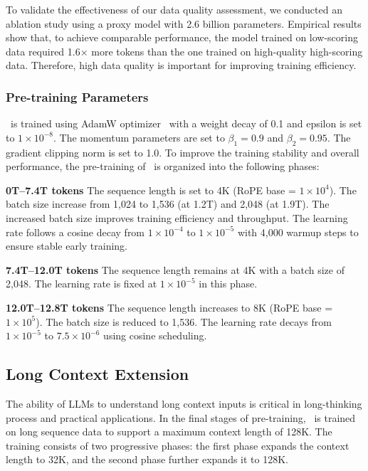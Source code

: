 To validate the effectiveness of our data quality assessment, we conducted an ablation study using a proxy model with 2.6 billion parameters. Empirical results show that, to achieve comparable performance, the model trained on low-scoring data required 1.6× more tokens than the one trained on high-quality high-scoring data. Therefore, high data quality is important for improving training efficiency.



\subsubsection{Pre-training Parameters} \label{sec:hyper_params}
\modelname~is trained using AdamW optimizer~\cite{loshchilov2017decoupled} with a weight decay of 0.1 and epsilon is set to $1 \times 10^{-8}$. 
The momentum parameters are set to $\beta_1 = 0.9$ and $\beta_2 = 0.95$. The gradient clipping norm is set to 1.0.
To improve the training stability and overall performance, the pre-training of \modelname~is organized into the following phases:


\textbf{0T--7.4T tokens} The sequence length is set to 4K (RoPE base = $1 \times 10^4$). The batch size increase from 1,024 to 1,536 (at 1.2T) and 2,048 (at 1.9T). The increased batch size improves training efficiency and throughput. The learning rate follows a cosine decay from $1 \times 10^{-4}$ to $1 \times 10^{-5}$ with 4,000 warmup steps to ensure stable early training.



\textbf{7.4T--12.0T tokens} The sequence length remains at 4K with a batch size of 2,048. The learning rate is fixed at $1 \times 10^{-5}$ in this phase.

\textbf{12.0T--12.8T tokens} The sequence length increases to 8K (RoPE base = $1 \times 10^5$). The batch size is reduced to 1,536. The learning rate decays from $1 \times 10^{-5}$ to $7.5 \times 10^{-6}$ using cosine scheduling.




\subsection{Long Context Extension}
The ability of LLMs to understand long context inputs is critical in long-thinking process and practical applications.
In the final stages of pre-training, \modelname~is trained on long sequence data to support a maximum context length of 128K.
The training consists of two progressive phases: the first phase expands the context length to 32K, and the second phase further expands it to 128K.


